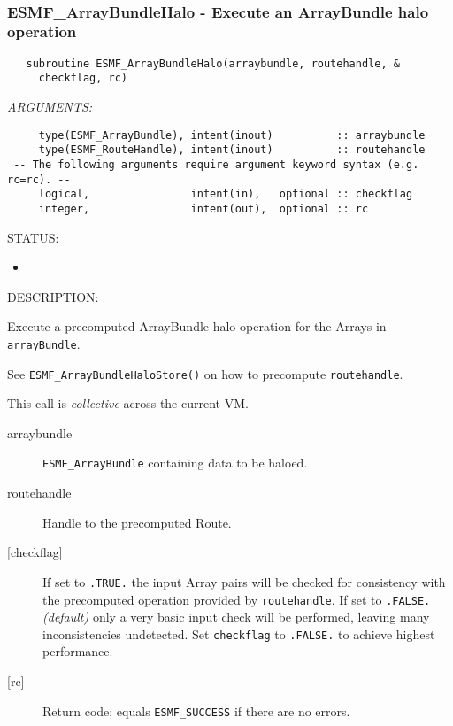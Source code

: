  
\mbox{}\hrulefill\ 
 
\subsubsection [ESMF\_ArrayBundleHalo] {ESMF\_ArrayBundleHalo - Execute an ArrayBundle halo operation}


  
\begin{verbatim}   subroutine ESMF_ArrayBundleHalo(arraybundle, routehandle, &
     checkflag, rc)\end{verbatim}{\em ARGUMENTS:}
\begin{verbatim}     type(ESMF_ArrayBundle), intent(inout)          :: arraybundle
     type(ESMF_RouteHandle), intent(inout)          :: routehandle
 -- The following arguments require argument keyword syntax (e.g. rc=rc). --
     logical,                intent(in),   optional :: checkflag
     integer,                intent(out),  optional :: rc\end{verbatim}
{\sf STATUS:}
   \begin{itemize}
   \item{}
   \end{itemize}
  
{\sf DESCRIPTION:\\ }


     Execute a precomputed ArrayBundle halo operation for the Arrays in
     {\tt arrayBundle}.
  
     See {\tt ESMF\_ArrayBundleHaloStore()} on how to precompute 
     {\tt routehandle}.
  
     This call is {\em collective} across the current VM.
  
     \begin{description}
     \item [arraybundle]
       {\tt ESMF\_ArrayBundle} containing data to be haloed.
     \item [routehandle]
       Handle to the precomputed Route.
     \item [{[checkflag]}]
       If set to {\tt .TRUE.} the input Array pairs will be checked for
       consistency with the precomputed operation provided by {\tt routehandle}.
       If set to {\tt .FALSE.} {\em (default)} only a very basic input check
       will be performed, leaving many inconsistencies undetected. Set
       {\tt checkflag} to {\tt .FALSE.} to achieve highest performance.
     \item [{[rc]}]
       Return code; equals {\tt ESMF\_SUCCESS} if there are no errors.
     \end{description}
   
